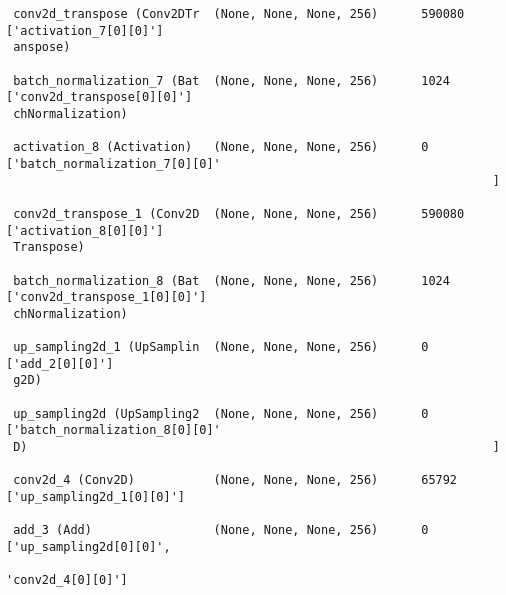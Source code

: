 \documentclass[
  letterpaper,
  DIV=11,
  numbers=noendperiod]{scrreprt}
\begin{document}
\begin{verbatim}
 conv2d_transpose (Conv2DTr  (None, None, None, 256)      590080    ['activation_7[0][0]']        
 anspose)                                                                                         
                                                                                                  
 batch_normalization_7 (Bat  (None, None, None, 256)      1024      ['conv2d_transpose[0][0]']    
 chNormalization)                                                                                 
                                                                                                  
 activation_8 (Activation)   (None, None, None, 256)      0         ['batch_normalization_7[0][0]'
                                                                    ]                             
                                                                                                  
 conv2d_transpose_1 (Conv2D  (None, None, None, 256)      590080    ['activation_8[0][0]']        
 Transpose)                                                                                       
                                                                                                  
 batch_normalization_8 (Bat  (None, None, None, 256)      1024      ['conv2d_transpose_1[0][0]']  
 chNormalization)                                                                                 
                                                                                                  
 up_sampling2d_1 (UpSamplin  (None, None, None, 256)      0         ['add_2[0][0]']               
 g2D)                                                                                             
                                                                                                  
 up_sampling2d (UpSampling2  (None, None, None, 256)      0         ['batch_normalization_8[0][0]'
 D)                                                                 ]                             
                                                                                                  
 conv2d_4 (Conv2D)           (None, None, None, 256)      65792     ['up_sampling2d_1[0][0]']     
                                                                                                  
 add_3 (Add)                 (None, None, None, 256)      0         ['up_sampling2d[0][0]',       
                                                                     'conv2d_4[0][0]']            
                                                                                                  

\end{verbatim}
\end{document}
